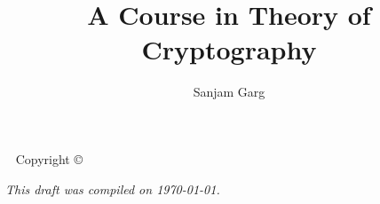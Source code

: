\documentclass[12pt]{tufte-book}
\title{A Course in Theory of Cryptography}
\author[Sanjam Garg]{Sanjam Garg}
\newcommand{\openepigraph}[2]{\begin{fullwidth}
  \sffamily\large
  \begin{doublespace}
  \noindent\allcaps{#1}\\\noindent\allcaps{#2}\end{doublespace}
  \end{fullwidth}
}
\newcommand{\blankpage}{\newpage\hbox{}\thispagestyle{empty}\newpage}
\begin{document}

\maketitle


\begin{fullwidth}
~\vfill
\thispagestyle{empty}
\setlength{\parindent}{0pt}
\setlength{\parskip}{\baselineskip}
Copyright \copyright\ \the\year\ \thanklessauthor



\par{}


\par \doclicenseThis

\par\textit{This draft was compiled on \today.}
\end{fullwidth}

\tableofcontents

\end{document}
